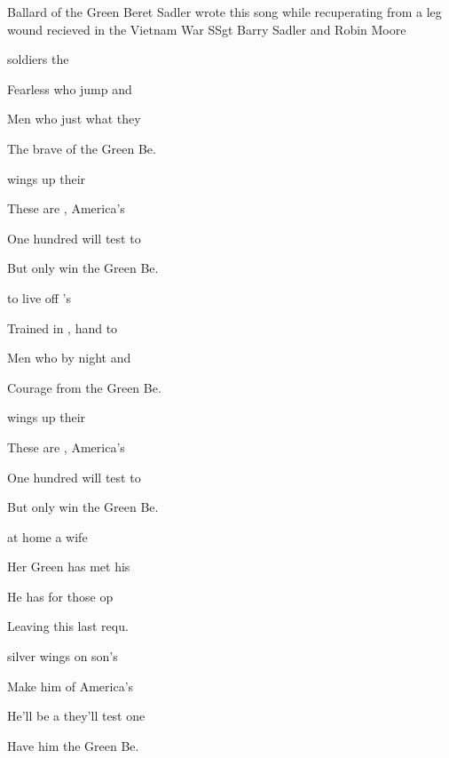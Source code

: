 \begin{SBSong}{Ballard of the Green Beret}
  {Sadler wrote this song while recuperating from a leg wound recieved in the Vietnam War}
  {SSgt Barry Sadler and Robin Moore}
  \begin{SBVerse}
	 soldiers  the 
 
	Fearless  who jump and 
	
	Men who  just what they 
	
	The brave  of the Green Be.
  \end{SBVerse}
  \begin{SBVerse}
	 wings up their 
	
	These are , America's 
	
	One hundred  will test to 
	
	But only  win the Green Be.
  \end{SBVerse}
  \begin{SBVerse}
	 to live off 's  
	
	Trained in , hand to  
	
	Men who  by night and  
	
	Courage  from the Green Be.
  \end{SBVerse}
  \begin{SBVerse}
	 wings up their 
	
	These are , America's 
	
	One hundred  will test to
 
	But only  win the Green Be.
  \end{SBVerse}
  \begin{SBVerse}
	 at home a  wife 
	
	Her Green  has met his  
	
	He has  for those op 
	
	Leaving  this last requ. 
  \end{SBVerse}
  \begin{SBVerse}
	 silver wings on  son's  
	
	Make him  of America's  
	
	He'll be a  they'll test one  
	
	Have him  the Green Be.  
  \end{SBVerse}
\end{SBSong}
